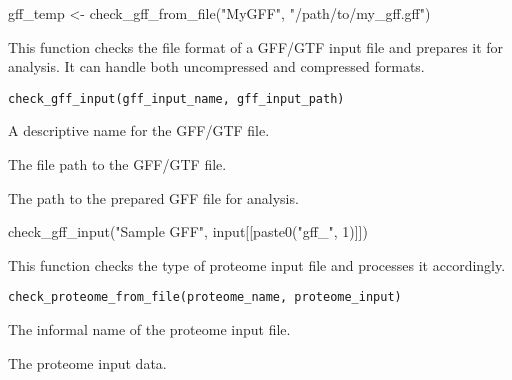 \documentclass[a4paper]{book}
\begin{document}
%
\begin{Examples}
\begin{ExampleCode}
gff_temp <- check_gff_from_file("MyGFF", "/path/to/my_gff.gff")
\end{ExampleCode}
\end{Examples}
%
\begin{Description}\relax
This function checks the file format of a GFF/GTF input file and prepares it for analysis. It can handle both uncompressed and compressed formats.
\end{Description}
%
\begin{Usage}
\begin{verbatim}
check_gff_input(gff_input_name, gff_input_path)
\end{verbatim}
\end{Usage}
%
\begin{Arguments}
\begin{ldescription}
\item[\code{gff\_input\_name}] A descriptive name for the GFF/GTF file.

\item[\code{gff\_input\_path}] The file path to the GFF/GTF file.
\end{ldescription}
\end{Arguments}
%
\begin{Value}
The path to the prepared GFF file for analysis.
\end{Value}
%
\begin{Examples}
\begin{ExampleCode}
check_gff_input("Sample GFF", input[[paste0("gff_", 1)]])
\end{ExampleCode}
\end{Examples}
%
\begin{Description}\relax
This function checks the type of proteome input file and processes it accordingly.
\end{Description}
%
\begin{Usage}
\begin{verbatim}
check_proteome_from_file(proteome_name, proteome_input)
\end{verbatim}
\end{Usage}
%
\begin{Arguments}
\begin{ldescription}
\item[\code{proteome\_name}] The informal name of the proteome input file.

\item[\code{proteome\_input}] The proteome input data.
\end{ldescription}
\end{Arguments}
\end{document}
